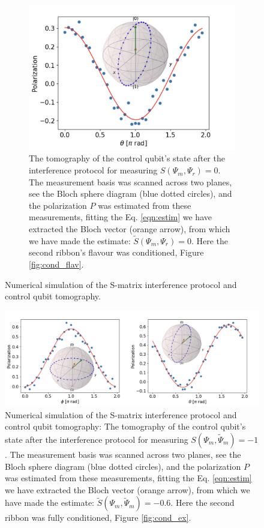 \documentclass[two column]{article}
\begin{document}
\begin{figure}
\begin{subfigure}{\textwidth}
        \label{fig:flav_cond_res_minus}
    \end{subfigure}
    \begin{subfigure}{\textwidth}
        \centering
        \includegraphics[width=0.4\linewidth]{Figures/flav_s_zero.pdf}
        \caption{The tomography of the control qubit's state after the interference protocol for measuring $S(\Psi_m, \Psi_r) = 0$. The measurement basis was scanned across two planes, see the Bloch sphere diagram (blue dotted circles), and the polarization $P$ was estimated from these measurements, fitting the Eq. \ref{eqn:estim} we have extracted the Bloch vector (orange arrow), from which we have made the estimate: $\tilde{S}(\Psi_m, \Psi_r) = 0$. Here the second ribbon's flavour was conditioned, Figure \ref{fig:cond_flav}.}
        \label{fig:flav_cond_res_zero}
    \end{subfigure}
    \caption{Numerical simulation of the S-matrix interference protocol and control qubit tomography.}
    \label{fig:flav_cond_res}
\end{figure}

\begin{figure}
        \centering
        \includegraphics[width=\textwidth]{Figures/exist_s_minus.pdf}
        \caption{Numerical simulation of the S-matrix interference protocol and control qubit tomography: The tomography of the control qubit's state after the interference protocol for measuring $S(\Psi_m, \tilde{\Psi}_m) = -1$. The measurement basis was scanned across two planes, see the Bloch sphere diagram (blue dotted circles), and the polarization $P$ was estimated from these measurements, fitting the Eq. \ref{eqn:estim} we have extracted the Bloch vector (orange arrow), from which we have made the estimate: $\tilde{S}(\Psi_m, \tilde{\Psi}_m) = -0.6$. Here the second ribbon was fully conditioned, Figure \ref{fig:cond_ex}.}
        \label{fig:ex_cond_res}
\end{figure}
\end{document}
